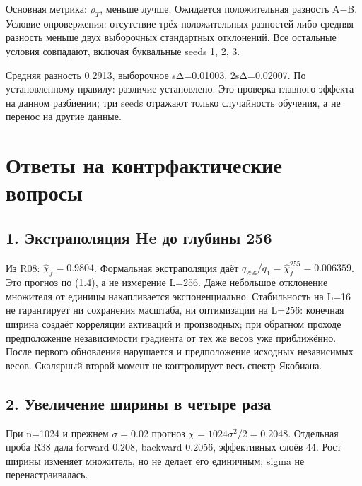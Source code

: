 Основная метрика: $\rho_T$, меньше лучше. Ожидается положительная разность A−B. Условие опровержения: отсутствие трёх положительных разностей либо средняя разность меньше двух выборочных стандартных отклонений. Все остальные условия совпадают, включая буквальные seeds 1, 2, 3.

\begin{table}[H]\centering\small\setlength{\tabcolsep}{4pt}
\caption{Основное сравнение E3: все три парных seed.}
\FitTable{}
\end{table}

Средняя разность 0.2913, выборочное sΔ=0.01003, 2sΔ=0.02007. По установленному правилу: различие установлено. Это проверка главного эффекта на данном разбиении; три seeds отражают только случайность обучения, а не перенос на другие данные.

\begin{table}[H]\centering\small\setlength{\tabcolsep}{4pt}
\caption{Средние значения и выборочные SD в E3.}
\FitTable{}
\end{table}

\section{Ответы на контрфактические вопросы}

\subsection*{1. Экстраполяция He до глубины 256}

Из R08: $\hat\chi_f=0.9804$. Формальная экстраполяция даёт $q_{256}/q_1=\hat\chi_f^{255}=0.006359$. Это прогноз по (1.4), а не измерение L=256. Даже небольшое отклонение множителя от единицы накапливается экспоненциально. Стабильность на L=16 не гарантирует ни сохранения масштаба, ни оптимизации на L=256: конечная ширина создаёт корреляции активаций и производных; при обратном проходе предположение независимости градиента от тех же весов уже приближённо. После первого обновления нарушается и предположение исходных независимых весов. Скалярный второй момент не контролирует весь спектр Якобиана.

\subsection*{2. Увеличение ширины в четыре раза}

При n=1024 и прежнем $\sigma=0.02$ прогноз $\chi=1024\sigma^2/2=0.2048$. Отдельная проба R38 дала forward 0.208, backward 0.2056, эффективных слоёв 44. Рост ширины изменяет множитель, но не делает его единичным; sigma не перенастраивалась.

